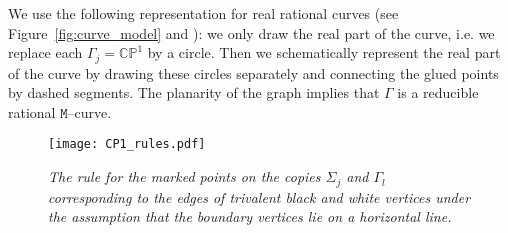 \documentclass[11pt]{amsart}
\theoremstyle{plain}
\numberwithin{equation}{section}
\begin{document}
We use the following representation for real rational curves (see Figure~\ref{fig:curve_model} and \cite{AG1, AG3}): we only draw the real part of the curve, i.e. we replace each  $\Gamma_j=\mathbb{CP}^1$ by a circle. Then we schematically represent the real part of the curve by drawing these circles separately and connecting the glued points by dashed segments. The planarity of the graph implies that $\Gamma$ is a reducible rational $\mathtt M$--curve. 

\begin{figure}%
  \centering
  \texttt{[image: CP1\_rules.pdf]}
  \vspace{-4 truecm}
  \caption{\small{\sl The rule for the marked points on the copies $\Sigma_{j}$ and $\Gamma_{l}$ corresponding to the edges of trivalent black and white vertices under the assumption that the boundary vertices lie on a horizontal line.}}
	\label{fig:markedpoints}
\end{figure}
\end{document}
